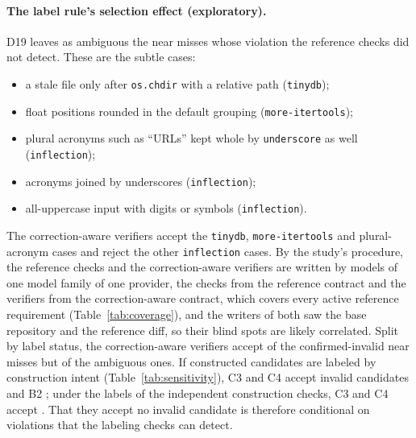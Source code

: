 \paragraph{The label rule's selection effect (exploratory).} D19 leaves as ambiguous the  near
misses whose violation the reference checks did not detect. These are the subtle cases:
\begin{itemize}
\item a stale file only after \texttt{os.chdir} with a relative path (\texttt{tinydb});
\item float positions rounded in the default grouping (\texttt{more-itertools});
\item plural acronyms such as ``URLs'' kept whole by \texttt{underscore} as well (\texttt{inflection});
\item acronyms joined by underscores (\texttt{inflection});
\item all-uppercase input with digits or symbols (\texttt{inflection}).
\end{itemize}
The correction-aware verifiers accept the \texttt{tinydb}, \texttt{more-itertools} and plural-acronym cases and reject
the other \texttt{inflection} cases. By the study's procedure, the reference checks and the correction-aware verifiers
are written by models of one model family of one provider, the checks from the reference contract and the verifiers
from the correction-aware contract, which covers every active reference requirement
(Table~\ref{tab:coverage}), and the writers of both saw the base repository and the reference diff, so their blind
spots are likely correlated. Split by label status, the correction-aware verifiers accept  of the
confirmed-invalid near misses but  of the ambiguous ones. If constructed candidates are labeled by
construction intent (Table~\ref{tab:sensitivity}), C3 and C4 accept  invalid candidates and B2
; under the labels of the independent construction checks, C3 and C4 accept . That
they accept no invalid candidate is therefore conditional on violations that the labeling checks can detect.


